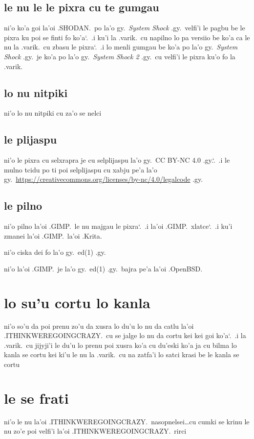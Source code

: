 \documentclass{report}
\newcommand\sds{\spacefactor\sfcode`.\ \space}
\begin{document}
\subsection{le nu le le pixra cu te gumgau}
ni'o ko'a goi la'oi .SHODAN.\ po la'o gy.\ \textit{System Shock} .gy.\ velfi'i le pagbu be le pixra ku poi se finti fo ko'a\sds  .i ku'i la .varik.\ cu napilno lo pa versiio be ko'a ca le nu la .varik.\ cu zbasu le pixra\sds  .i lo menli gumgau be ko'a po la'o gy.\ \textit{System Shock} .gy.\ je ko'a po la'o gy.\ \textit{System Shock 2} .gy.\ cu velfi'i le pixra ku'o fo la .varik.
\subsection{lo nu nitpiki}
ni'o lo nu nitpiki cu za'o se nelci

\subsection{le plijaspu}
ni'o le pixra cu selxrapra je cu selplijaspu la'o gy.\ CC BY-NC 4.0 .gy.\sds  .i le mulno tcidu po ti poi selplijaspu cu xabju pe'a la'o gy.\ \url{https://creativecommons.org/licenses/by-nc/4.0/legalcode} .gy.

\subsection{le pilno}
ni'o pilno la'oi .GIMP.\ le nu majgau le pixra\sds  .i  la'oi .GIMP.\ xlatce\sds  .i ku'i zmanei la'oi .GIMP.\ la'oi .Krita.

ni'o ciska dei fo la'o gy.\ ed(1) .gy.

ni'o la'oi .GIMP.\ je la'o gy.\ ed(1) .gy.\ bajra pe'a la'oi .OpenBSD.

\section{lo su'u cortu lo kanla}
ni'o so'u da poi prenu zo'u da xusra lo du'u lo nu da catlu la'oi .ITHINKWEREGOINGCRAZY.\ cu se jalge lo nu da cortu kei kei goi ko'a\sds  .i la .varik.\ cu jijyji'i le du'u lo prenu poi xusra ko'a cu du'eski ko'a ja cu bilma lo kanla se cortu kei ki'u le nu la .varik.\ cu na zatfa'i lo satci krasi be le kanla se cortu

\section{le se frati}
ni'o le nu la'oi .ITHINKWEREGOINGCRAZY.\ nasopnelsei\ldots cu cumki se krinu le nu zo'e poi velfi'i la'oi .ITHINKWEREGOINGCRAZY.\ rirci
\end{document}
